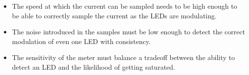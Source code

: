 	\begin{itemize}
		\item The speed at which the current can be sampled needs to be high enough to be able to correctly sample the current as the LEDs are modulating.

		\item The noise introduced in the samples must be low enough to detect the correct modulation of even one LED with consistency.

		\item The sensitivity of the meter must balance a tradeoff between the ability to detect an LED and the likelihood of getting saturated.

	\end{itemize}


















